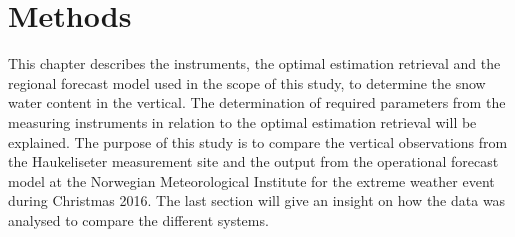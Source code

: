 \chapter{Methods}\label{ch:Methods}
This chapter describes the instruments, the optimal estimation retrieval and the regional forecast model used in the scope of this study, to determine the snow water content in the vertical. The determination of required parameters from the measuring instruments in relation to the optimal estimation retrieval will be explained. The purpose of this study is to compare the vertical observations from the Haukeliseter measurement site and the output from the operational forecast model at the Norwegian Meteorological Institute for the extreme weather event during Christmas 2016. 
The last section will give an insight on how the data was analysed to compare the different systems. 







